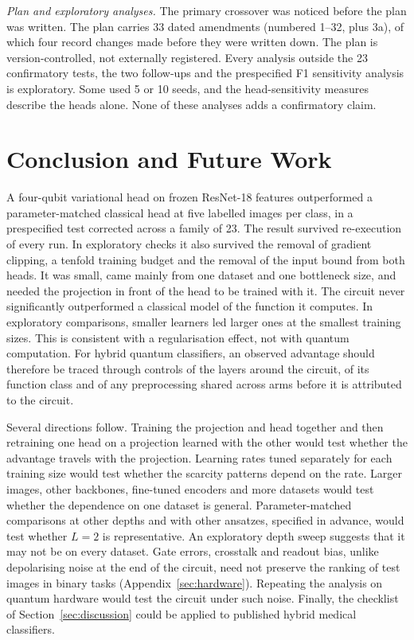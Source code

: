 \documentclass{ieeeaccess}
\begin{document}
\emph{Plan and exploratory analyses.} The primary crossover was noticed before the plan was written. The plan carries 33 dated amendments (numbered 1--32, plus 3a), of which four record changes made before they were written down. The plan is version-controlled, not externally registered. Every analysis outside the 23 confirmatory tests, the two follow-ups and the prespecified F1 sensitivity analysis is exploratory. Some used 5 or 10 seeds, and the head-sensitivity measures describe the heads alone. None of these analyses adds a confirmatory claim.

\section{Conclusion and Future Work}
\label{sec:conclusion}
A four-qubit variational head on frozen ResNet-18 features outperformed a parameter-matched classical head at five labelled images per class, in a prespecified test corrected across a family of 23. The result survived re-execution of every run. In exploratory checks it also survived the removal of gradient clipping, a tenfold training budget and the removal of the input bound from both heads. It was small, came mainly from one dataset and one bottleneck size, and needed the projection in front of the head to be trained with it. The circuit never significantly outperformed a classical model of the function it computes. In exploratory comparisons, smaller learners led larger ones at the smallest training sizes. This is consistent with a regularisation effect, not with quantum computation. For hybrid quantum classifiers, an observed advantage should therefore be traced through controls of the layers around the circuit, of its function class and of any preprocessing shared across arms before it is attributed to the circuit.

Several directions follow. Training the projection and head together and then retraining one head on a projection learned with the other would test whether the advantage travels with the projection. Learning rates tuned separately for each training size would test whether the scarcity patterns depend on the rate. Larger images, other backbones, fine-tuned encoders and more datasets would test whether the dependence on one dataset is general. Parameter-matched comparisons at other depths and with other ansatzes, specified in advance, would test whether $L=2$ is representative. An exploratory depth sweep suggests that it may not be on every dataset. Gate errors, crosstalk and readout bias, unlike depolarising noise at the end of the circuit, need not preserve the ranking of test images in binary tasks (Appendix~\ref{sec:hardware}). Repeating the analysis on quantum hardware would test the circuit under such noise. Finally, the checklist of Section~\ref{sec:discussion} could be applied to published hybrid medical classifiers.
\end{document}
